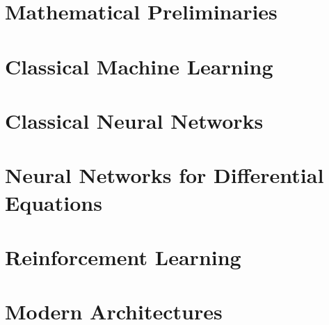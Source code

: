 \documentclass{kaobook}
\begin{document}
\frontmatter


\cleardoublepage 
\color{black}            %
\tableofcontents
\cleardoublepage      
\mainmatter
\part{Mathematical Preliminaries}







\part{Classical Machine Learning}
         
    
    
         
         
   
    

\part{Classical Neural Networks}








\part{Neural Networks for Differential Equations}






\part{Reinforcement Learning}



\part{Modern Architectures}


\end{document}
